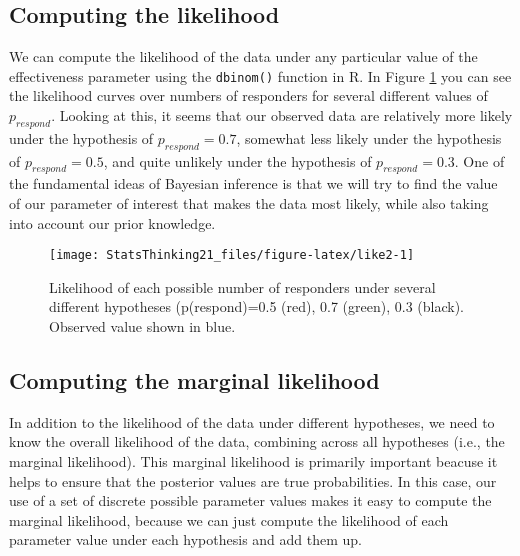 \documentclass[]{book}
\theoremstyle{definition}
\theoremstyle{definition}
\theoremstyle{definition}
\theoremstyle{remark}
\begin{document}
\subsection{Computing the likelihood}\label{computing-the-likelihood-1}

We can compute the likelihood of the data under any particular value of
the effectiveness parameter using the \texttt{dbinom()} function in R.
In Figure \ref{fig:like2} you can see the likelihood curves over numbers
of responders for several different values of \(p_{respond}\). Looking
at this, it seems that our observed data are relatively more likely
under the hypothesis of \(p_{respond}=0.7\), somewhat less likely under
the hypothesis of \(p_{respond}=0.5\), and quite unlikely under the
hypothesis of \(p_{respond}=0.3\). One of the fundamental ideas of
Bayesian inference is that we will try to find the value of our
parameter of interest that makes the data most likely, while also taking
into account our prior knowledge.

\begin{figure}
\texttt{[image: StatsThinking21\_files/figure-latex/like2-1]} \caption{Likelihood of each possible number of responders under several different hypotheses (p(respond)=0.5 (red), 0.7 (green), 0.3 (black).  Observed value shown in blue.}\label{fig:like2}
\end{figure}

\subsection{Computing the marginal
likelihood}\label{computing-the-marginal-likelihood-1}

In addition to the likelihood of the data under different hypotheses, we
need to know the overall likelihood of the data, combining across all
hypotheses (i.e., the marginal likelihood). This marginal likelihood is
primarily important beacuse it helps to ensure that the posterior values
are true probabilities. In this case, our use of a set of discrete
possible parameter values makes it easy to compute the marginal
likelihood, because we can just compute the likelihood of each parameter
value under each hypothesis and add them up.
\end{document}
